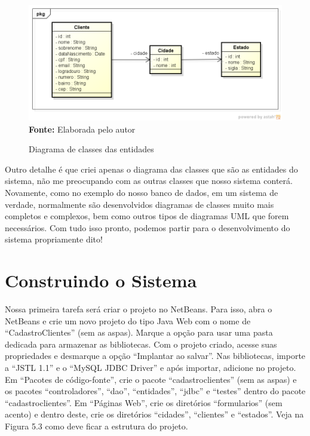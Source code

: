 \FloatBarrier
\begin{figure}[!htbp]
    \centering
    \caption{Diagrama de classes das entidades}
    \includegraphics[scale=0.5]{imagens/cap05DiagramaClasses}
    \\\textbf{Fonte:} Elaborada pelo autor
    \label{fig:cap05DiagramaClasses}
\end{figure}
\FloatBarrier




Outro detalhe é que criei apenas o diagrama das classes que são as entidades do sistema, não me preocupando com as outras classes que nosso sistema conterá. Novamente, como no exemplo do nosso banco de dados, em um sistema de verdade, normalmente são desenvolvidos diagramas de classes muito mais completos e complexos, bem como outros tipos de diagramas UML que forem necessários. Com tudo isso pronto, podemos partir para o desenvolvimento do sistema propriamente dito!



\section{Construindo o Sistema}

Nossa primeira tarefa será criar o projeto no NetBeans. Para isso, abra o NetBeans e crie um novo projeto do tipo Java Web com o nome de ``CadastroClientes'' (sem as aspas). Marque a opção para usar uma pasta dedicada para armazenar as bibliotecas. Com o projeto criado, acesse suas propriedades e desmarque a opção ``Implantar ao salvar''. Nas bibliotecas, importe a ``JSTL 1.1'' e o ``MySQL JDBC Driver'' e após importar, adicione no projeto.
Em ``Pacotes de código-fonte'', crie o pacote ``cadastroclientes'' (sem as aspas) e os pacotes ``controladores'', ``dao'', ``entidades'', ``jdbc'' e ``testes'' dentro do pacote ``cadastroclientes''. Em ``Páginas Web'', crie os diretórios ``formularios'' (sem acento) e dentro deste, crie os diretórios ``cidades'', ``clientes'' e ``estados''. Veja na Figura 5.3 como deve ficar a estrutura do projeto.






